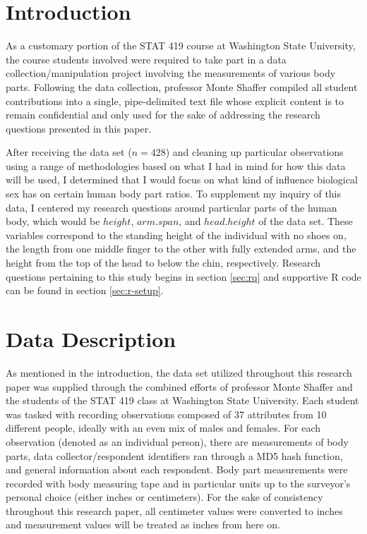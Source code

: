 \documentclass[]{article}
\begin{document}
\vskip -8.5pt




\noindent  

\section{Introduction}
\label{sec:intro}

As a customary portion of the STAT 419 course at Washington State
University, the course students involved were required to take part in a
data collection/manipulation project involving the measurements of
various body parts. Following the data collection, professor Monte
Shaffer compiled all student contributions into a single, pipe-delimited
text file whose explicit content is to remain confidential and only used
for the sake of addressing the research questions presented in this
paper.

\vspace{0.25cm}

After receiving the data set (\(n=428\)) and cleaning up particular
observations using a range of methodologies based on what I had in mind
for how this data will be used, I determined that I would focus on what
kind of influence biological sex has on certain human body part ratios.
To supplement my inquiry of this data, I centered my research questions
around particular parts of the human body, which would be \(height\),
\(arm.span\), and \(head.height\) of the data set. These variables
correspond to the standing height of the individual with no shoes on,
the length from one middle finger to the other with fully extended arms,
and the height from the top of the head to below the chin, respectively.
Research questions pertaining to this study begins in section
\ref{sec:rq} and supportive R code can be found in section
\ref{sec:r-setup}.

\section{Data Description}
\label{sec:data}

As mentioned in the introduction, the data set utilized throughout this
research paper was supplied through the combined efforts of professor
Monte Shaffer and the students of the STAT 419 class at Washington State
University. Each student was tasked with recording observations composed
of 37 attributes from 10 different people, ideally with an even mix of
males and females. For each observation (denoted as an individual
person), there are measurements of body parts, data collector/respondent
identifiers ran through a MD5 hash function, and general information
about each respondent. Body part measurements were recorded with body
measuring tape and in particular units up to the surveyor's personal
choice (either inches or centimeters). For the sake of consistency
throughout this research paper, all centimeter values were converted to
inches and measurement values will be treated as inches from here on.
\end{document}
